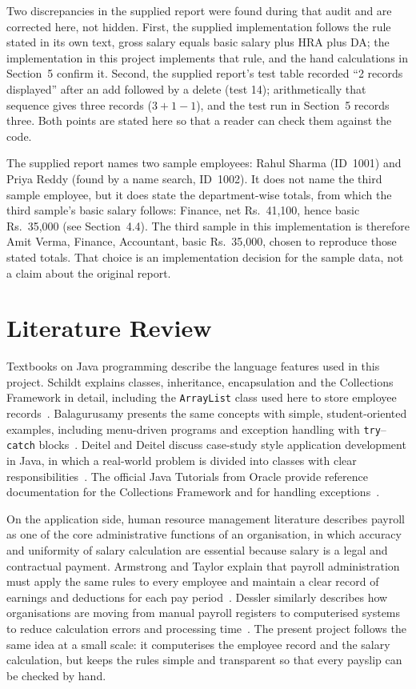 \documentclass[11pt,a4paper]{article}
\begin{document}
Two discrepancies in the supplied report were found during that
audit and are corrected here, not hidden. First, the supplied
implementation follows the rule stated in its own text, gross salary
equals basic salary plus HRA plus DA; the implementation in this
project implements that rule, and the hand calculations in
Section~5 confirm it. Second, the supplied report's test table
recorded ``2 records displayed'' after an add followed by a delete
(test 14); arithmetically that sequence gives three records
($3+1-1$), and the test run in Section~5 records three. Both points
are stated here so that a reader can check them against the code.

The supplied report names two sample employees: Rahul Sharma
(ID~1001) and Priya Reddy (found by a name search, ID~1002). It does
not name the third sample employee, but it does state the
department-wise totals, from which the third sample's basic salary
follows: Finance, net Rs.~41,100, hence basic Rs.~35,000 (see
Section~4.4). The third sample in this implementation is therefore
Amit Verma, Finance, Accountant, basic Rs.~35,000, chosen to reproduce
those stated totals. That choice is an implementation decision for
the sample data, not a claim about the original report.

\section{Literature Review}

Textbooks on Java programming describe the language features used in
this project. Schildt explains classes, inheritance, encapsulation
and the Collections Framework in detail, including the
\texttt{ArrayList} class used here to store employee records~\cite{schildt}.
Balagurusamy presents the same concepts with simple,
student-oriented examples, including menu-driven programs and
exception handling with \texttt{try}--\texttt{catch}
blocks~\cite{balagurusamy}. Deitel and Deitel discuss case-study
style application development in Java, in which a real-world problem
is divided into classes with clear responsibilities~\cite{deitel}.
The official Java Tutorials from Oracle provide reference
documentation for the Collections Framework and for handling
exceptions~\cite{oracle}.

On the application side, human resource management literature
describes payroll as one of the core administrative functions of an
organisation, in which accuracy and uniformity of salary calculation
are essential because salary is a legal and contractual payment.
Armstrong and Taylor explain that payroll administration must apply
the same rules to every employee and maintain a clear record of
earnings and deductions for each pay period~\cite{armstrong}.
Dessler similarly describes how organisations are moving from manual
payroll registers to computerised systems to reduce calculation
errors and processing time~\cite{dessler}. The present project
follows the same idea at a small scale: it computerises the employee
record and the salary calculation, but keeps the rules simple and
transparent so that every payslip can be checked by hand.
\end{document}
